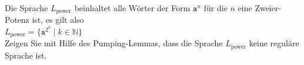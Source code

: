 \exercise
Die Sprache $L_{\mathrm{power}}$ beinhaltet alle W\"orter der Form $\mathtt{a}^n$ f\"ur die $n$ eine
Zweier-Potenz ist, es gilt also
\\[0.2cm]
\hspace*{1.3cm}
$L_{\mathrm{power}} = \bigl\{ \mathtt{a}^{2^k} \mid k \in \mathbb{N} \bigr\}$
\\[0.2cm]
Zeigen Sie mit Hilfe des Pumping-Lemmas, dass die Sprache $L_{\mathrm{power}}$ keine regul\"are Sprache ist.
\eox



